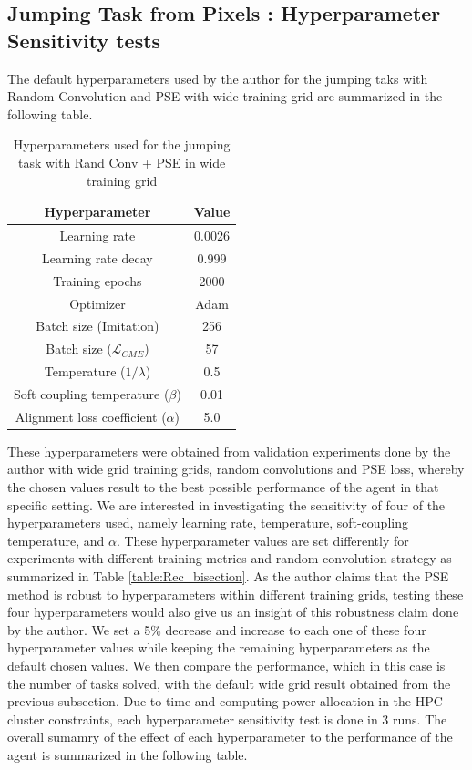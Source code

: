 \documentclass{usiinftr}
\begin{document}
\subsection{Jumping Task from Pixels : Hyperparameter Sensitivity tests}
The default hyperparameters used by the author for the jumping taks with Random Convolution and PSE with wide training grid are summarized in the following table. 

\begin{table}[h!]
\centering
\caption{Hyperparameters used for the jumping task with Rand Conv + PSE in wide training grid}
\begin{tabular}{cc}
\hline
Hyperparameter & Value \\
\hline
Learning rate & 0.0026 \\
Learning rate decay & 0.999\\
Training epochs & 2000 \\
Optimizer & Adam \\
Batch size (Imitation) & 256 \\
Batch size ($\mathcal{L}_{CME}$) & 57 \\
Temperature ($1 / \lambda $) & 0.5 \\
Soft coupling temperature ($\beta$) & 0.01 \\
Alignment loss coefficient ($\alpha$) & 5.0\\
\hline
\end{tabular}
\end{table}

These hyperparameters were obtained from validation experiments done by the author with wide grid training grids, random convolutions and PSE loss, whereby the chosen values result to the best possible performance of the agent in that specific setting. We are interested in investigating the sensitivity of four of the hyperparameters used, namely learning rate, temperature, soft-coupling temperature, and $\alpha$. These hyperparameter values are set differently for experiments with different training metrics and random convolution strategy as summarized in Table \ref{table:Rec_bisection}. As the author claims that the PSE method is robust to hyperparameters within different training grids, testing these four hyperparameters would also give us an insight of this robustness claim done by the author. We set a 5\% decrease and increase to each one of these four hyperparameter values while keeping the remaining hyperparameters as the default chosen values. We then compare the performance, which in this case is the number of tasks solved, with the default wide grid result obtained from the previous subsection. Due to time and computing power allocation in the HPC cluster constraints, each hyperparameter sensitivity test is done in 3 runs. The overall sumamry of the effect of each hyperparameter to the performance of the agent is summarized in the following table.
\end{document}
